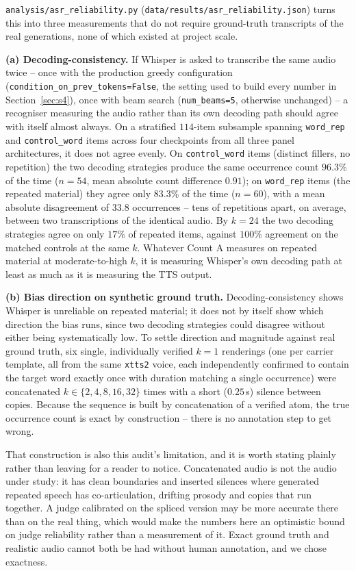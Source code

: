 \documentclass[11pt]{article}
\begin{document}
\texttt{analysis/asr\_reliability.py}
(\texttt{data/results/asr\_reliability.json}) turns this into three
measurements that do not require ground-truth transcripts of the real
generations, none of which existed at project scale.

\textbf{(a) Decoding-consistency.} If Whisper is asked to transcribe the same
audio twice -- once with the production greedy configuration
(\texttt{condition\_on\_prev\_tokens=False}, the setting used to build every
number in Section~\ref{sec:s4}), once with beam search
(\texttt{num\_beams=5}, otherwise unchanged) -- a recogniser measuring the
audio rather than its own decoding path should agree with itself almost
always. On a stratified $114$-item subsample spanning \texttt{word\_rep} and
\texttt{control\_word} items across four checkpoints from all three panel
architectures, it does not agree evenly. On \texttt{control\_word} items
(distinct fillers, no repetition) the two decoding strategies produce the
same occurrence count $96.3\%$ of the time ($n{=}54$, mean absolute count
difference $0.91$); on \texttt{word\_rep} items (the repeated material) they
agree only $83.3\%$ of the time ($n{=}60$), with a mean absolute
disagreement of $33.8$ occurrences -- tens of repetitions apart, on average,
between two transcriptions of the identical audio. By $k{=}24$ the two
decoding strategies agree on only $17\%$ of repeated items, against $100\%$
agreement on the matched controls at the same $k$. Whatever Count A measures
on repeated material at moderate-to-high $k$, it is measuring Whisper's own
decoding path at least as much as it is measuring the TTS output.

\textbf{(b) Bias direction on synthetic ground truth.} Decoding-consistency
shows Whisper is unreliable on repeated material; it does not by itself show
which direction the bias runs, since two decoding strategies could disagree
without either being systematically low. To settle direction and magnitude
against real ground truth, six single, individually verified $k{=}1$
renderings (one per carrier template, all from the same \texttt{xtts2} voice,
each independently confirmed to contain the target word exactly once with
duration matching a single occurrence) were concatenated $k\in\{2,4,8,16,32\}$
times with a short ($0.25\,$s) silence between copies. Because the sequence
is built by concatenation of a verified atom, the true occurrence count is
exact by construction -- there is no annotation step to get wrong.

That construction is also this audit's limitation, and it is worth stating
plainly rather than leaving for a reader to notice. Concatenated audio is not
the audio under study: it has clean boundaries and inserted silences where
generated repeated speech has co-articulation, drifting prosody and copies that
run together. A judge calibrated on the spliced version may be more accurate
there than on the real thing, which would make the numbers here an optimistic
bound on judge reliability rather than a measurement of it. Exact ground truth
and realistic audio cannot both be had without human annotation, and we chose
exactness.
\end{document}
